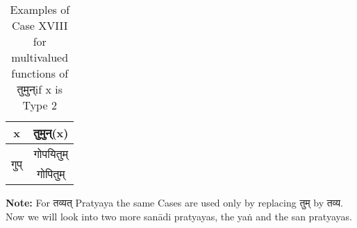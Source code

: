\begin{table}[h!]
	\begin{center}
		\begin{tabular}{|c|c|} 
			\hline
			x & \texthindi{तुमुन्}(x)\\
			\hline
			\multirow{2}{*}{\texthindi{गुप्}}
			&\texthindi{गोपयितुम्}\\ 
			&\texthindi{गोपितुम्}\\
			\hline
		\end{tabular}
		\caption{Examples of Case XVIII for multivalued functions of \texthindi{तुमुन्}if x is Type 2 }
		\label{table:6.76}
	\end{center}
\end{table}

\textbf{Note:} For \texthindi{तव्यत्} Pratyaya the same Cases are used only by replacing \texthindi{तुम्} by \texthindi{तव्य}.\\

Now we will look into two more sanādi pratyayas, the yaṅ and the san pratyayas.